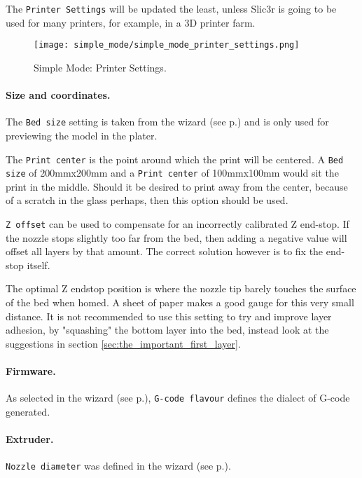The \texttt{Printer Settings} will be updated the least, unless Slic3r is going to be used for many printers, for example, in a 3D printer farm.

\begin{figure}[H]
\centering
\texttt{[image: simple\_mode/simple\_mode\_printer\_settings.png]}
\caption{Simple Mode: Printer Settings.}
\label{fig:simple_mode_printer_settings}
\end{figure}

\paragraph{Size and coordinates.} %
\label{par:size_and_coordinates}
The \texttt{Bed size} setting is taken from the wizard (see p.\pageref{sub:2_bed_size}) and is only used for previewing the model in the plater.  

The \texttt{Print center} is the point around which the print will be centered.  A \texttt{Bed size} of 200mmx200mm and a \texttt{Print center} of 100mmx100mm would sit the print in the middle.  Should it be desired to print away from the center, because of a scratch in the glass perhaps, then this option should be used.

\texttt{Z offset} can be used to compensate for an incorrectly calibrated Z end-stop.  If the nozzle stops slightly too far from the bed, then adding a negative value will offset all layers by that amount.  The correct solution however is to fix the end-stop itself.  

The optimal Z endstop position is where the nozzle tip barely touches the surface of the bed when homed.  A sheet of paper makes a good gauge for this very small distance.  It is not recommended to use this setting to try and improve layer adhesion, by "squashing" the bottom layer into the bed, instead look at the suggestions in section \ref{sec:the_important_first_layer}.

\paragraph{Firmware.} %
\label{par:firmware}
As selected in the wizard (see p.\pageref{sub:1_firmware_type}), \texttt{G-code flavour} defines the dialect of G-code generated.


\paragraph{Extruder.} %
\label{par:extruder}
\texttt{Nozzle diameter} was defined in the wizard (see p.\pageref{sub:3_nozzle_diameter}).


